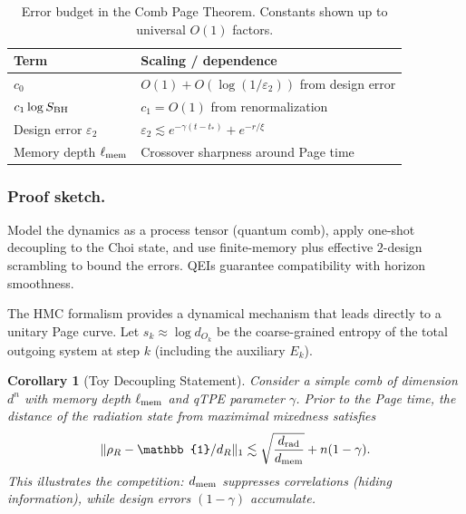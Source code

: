 \documentclass[aps,prd,preprint,onecolumn,superscriptaddress,nofootinbib,longbibliography,floatfix,11pt,showpacs,showkeys]{revtex4-2}
\newcommand{\HMC}{\textsc{HMC}\xspace}
\theoremstyle{plain}
\newtheorem{corollary}[theorem]{Corollary}
\theoremstyle{definition}
\theoremstyle{remark}
\begin{document}
\begin{table}[hbtp]
\centering
\caption{Error budget in the Comb Page Theorem. Constants shown up to universal \(O(1)\) factors.}
\label{tab:error_budget}
\small
\begin{tabular*}{\textwidth}{@{\extracolsep{\fill}}ll@{}}
\toprule
\textbf{Term} & \textbf{Scaling / dependence} \\
\midrule
\(c_0\) & \(O(1) + O(\log(1/\varepsilon_2))\) from design error \\
\(c_1\log S_{\rm BH}\) & \(c_1=O(1)\) from renormalization \\
Design error \(\varepsilon_2\) & \(\varepsilon_2 \lesssim e^{-\gamma (t-t_\ast)} + e^{-r/\xi}\) \\
Memory depth \(\ell_{\rm mem}\) & Crossover sharpness around Page time \\
\bottomrule
\end{tabular*}
\end{table}

\subsubsection{Proof sketch.}
Model the dynamics as a process tensor (quantum comb), apply one-shot decoupling to the
Choi state, and use finite-memory plus effective \(2\)-design scrambling to bound the
errors.  QEIs guarantee compatibility with horizon smoothness.

The \HMC{} formalism provides a dynamical mechanism that leads directly to a unitary Page curve. Let $s_k \approx \log d_{O_k}$ be the coarse-grained entropy of the total outgoing system at step $k$ (including the auxiliary $E_k$).
%
\begin{corollary}[Toy Decoupling Statement]
Consider a simple comb of dimension $d^n$ with memory depth $\ell_{\rm mem}$ and qTPE parameter $\gamma$.
Prior to the Page time, the distance of the radiation state from maximimal mixedness satisfies
\[
\|\rho_{R} - \mathbb{1}/d_R\|_1 \lesssim \sqrt{\frac{d_{\rm rad}}{d_{\rm mem}}} + n(1-\gamma).
\]
This illustrates the competition: $d_{\rm mem}$ suppresses correlations (hiding information), while design errors $(1-\gamma)$ accumulate.
\end{corollary}
\end{document}
